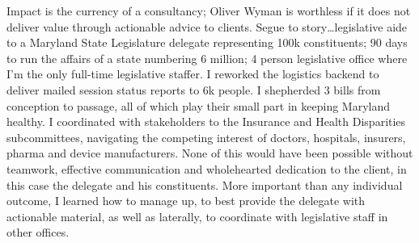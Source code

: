 \documentclass[a4paper]{../res}
\begin{document}
\begin{sloppypar}
\begin{resume}
Impact is the currency of a consultancy; Oliver Wyman is worthless if it does not deliver value through actionable advice to clients. Segue to story\ldots legislative aide to a Maryland State Legislature delegate representing 100k constituents; 90 days to run the affairs of a state numbering 6 million; 4 person legislative office where I'm the only full-time legislative staffer. I reworked the logistics backend to deliver mailed session status reports to 6k people. I shepherded 3 bills from conception to passage, all of which play their small part in keeping Maryland healthy. I coordinated with stakeholders to the Insurance and Health Disparities subcommittees, navigating the competing interest of doctors, hospitals, insurers, pharma and device manufacturers. None of this would have been possible without teamwork, effective communication and wholehearted dedication to the client, in this case the delegate and his constituents. More important than any individual outcome, I learned how to manage up, to best provide the delegate with actionable material, as well as laterally, to coordinate with legislative staff in other offices.







\end{resume}
\end{sloppypar}
\end{document}
